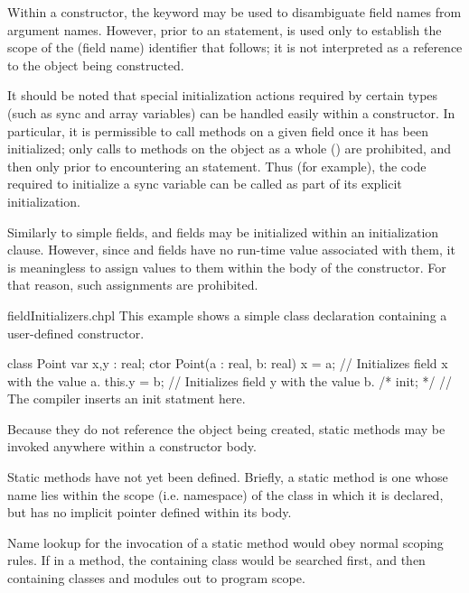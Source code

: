 Within a constructor, the  keyword may be used to disambiguate field
names from argument names.  However, prior to an  statement, 
 is used only to establish the scope of the (field name) identifier
that follows; it is not interpreted as a reference to the object being constructed.

\begin{note}
It should be noted that special initialization actions required by certain types
(such as sync and array variables) can be handled easily within a constructor.
In particular, it is permissible to call
methods on a given field once it has been initialized; only calls to methods on
the object as a whole () are prohibited, and then only prior to
encountering an  statement.  Thus (for example), the code required to
initialize a sync variable can be called as part of its explicit initialization.
\end{note}

Similarly to simple fields, 
and  fields may be initialized within an initialization clause.
However, since  and  fields have no run-time value
associated with them, it is meaningless to assign values to them within the body
of the constructor.  For that reason, such assignments are prohibited.

\begin{chapelexample}{fieldInitializers.chpl}
This example shows a simple class declaration containing a user-defined constructor.
\begin{chapel}
class Point { 
  var x,y : real; 
  ctor Point(a : real, b: real)
  { x = a;          // Initializes field x with the value a.
    this.y = b;     // Initializes field y with the value b.
    /* init; */     // The compiler inserts an init statment here.
  }
}
\end{chapel}
\end{chapelexample}
\noindent
Because they do not reference the object being created, static methods may be
invoked anywhere within a constructor body.

\begin{future}
Static methods have not yet been defined.  Briefly, a static method is one whose
name lies within the scope (i.e. namespace) of the class in which it is
declared, but has no implicit  pointer defined within its body.

Name lookup for the invocation of a static method would obey normal scoping
rules.  If in a method, the containing class would be searched first, and then
containing classes and modules out to program scope.
\end{future}

